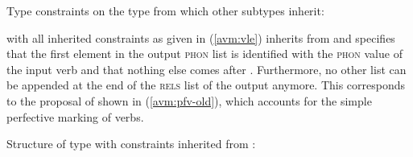 \ea\label{avm:pfv-new}
Type constraints on the type  from which other subtypes inherit:\\
\z

 with all inherited constraints as given in (\ref{avm:vle}) inherits from  and specifies that the first element in the output \textsc{phon} list is identified with the \textsc{phon} value of the input verb
and that nothing else comes after .
Furthermore, no other list can be appended at the end of the \textsc{rels} list of the output anymore.
This corresponds to the proposal of \citet[246]{MuellerLipenkova2013} shown in (\ref{avm:pfv-old}), 
which accounts for the simple perfective marking of verbs.

\newpage
\ea\label{avm:vle}
Structure of type  with constraints inherited from :\\
\z

